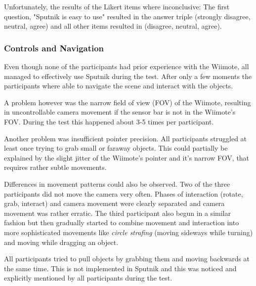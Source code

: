 \documentclass[10pt,a4paper]{scrartcl}
\begin{document}
Unfortunately, the results of the Likert items where inconclusive: The first question, "Sputnik is easy to use" resulted in the answer triple (strongly disagree, neutral, agree) and all other items resulted in (disagree, neutral, agree).



\subsubsection{Controls and Navigation}
Even though none of the participants had prior experience with the Wiimote, all managed to effectively use Sputnik during the test. After only a few moments the participants where able to navigate the scene and interact with the objects. 

A problem however was the narrow field of view (FOV) of the Wiimote, resulting in uncontrollable camera movement if the sensor bar is not in the Wiimote's FOV. During the test this happened about 3-5 times per participant.

Another problem was insufficient pointer precision. All participants struggled at least once trying to grab small or faraway objects. This could partially be explained by the slight jitter of the Wiimote's pointer and it's narrow FOV, that requires rather subtle movements.

Differences in movement patterns could also be observed. Two of the three participants did not move the camera very often. Phases of interaction (rotate, grab, interact) and camera movement were clearly separated and camera movement was rather erratic. The third participant also begun in a similar fashion but then gradually started to combine movement and interaction into more sophisticated movements like \emph{circle strafing} (moving sideways while turning) and moving while dragging an object.

All participants tried to pull objects by grabbing them and moving backwards at the same time. This is not implemented in Sputnik and this was noticed and explicitly mentioned by all participants during the test.



\end{document}
